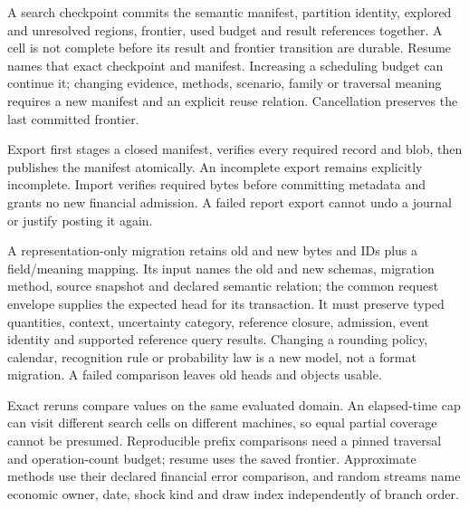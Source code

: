 A search checkpoint commits the semantic manifest, partition identity, explored
and unresolved regions, frontier, used budget and result references together.
A cell is not complete before its result and frontier transition are durable.
Resume names that exact checkpoint and manifest. Increasing a scheduling budget
can continue it; changing evidence, methods, scenario, family or traversal meaning
requires a new manifest and an explicit reuse relation. Cancellation preserves
the last committed frontier.

Export first stages a closed manifest, verifies every required record and blob,
then publishes the manifest atomically. An incomplete export remains explicitly
incomplete. Import verifies required bytes before committing metadata and grants
no new financial admission. A failed report export cannot undo a journal or
justify posting it again.

A representation-only migration retains old and new bytes and IDs plus a
field/meaning mapping. Its input names the old and new schemas, migration
method, source snapshot and declared semantic relation; the common request
envelope supplies the expected head for its transaction. It must preserve typed quantities, context, uncertainty
category, reference closure, admission, event identity and supported reference
query results. Changing a rounding policy, calendar, recognition rule or
probability law is a new model, not a format migration. A failed comparison
leaves old heads and objects usable.

Exact reruns compare values on the same evaluated domain. An elapsed-time cap
can visit different search cells on different machines, so equal partial
coverage cannot be presumed. Reproducible prefix comparisons need a pinned
traversal and operation-count budget; resume uses the saved frontier. Approximate
methods use their declared financial error comparison, and random streams name
economic owner, date, shock kind and draw index independently of branch order.
